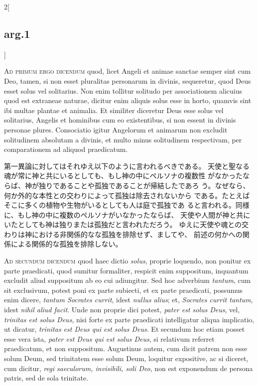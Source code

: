 \documentclass[paper=a4paper,fontsize=10pt,jafontsize=9pt,titlepage]{jlreq}
\begin{document}
\begin{paracol}{2}[\subsection{arg.1}]
\switchcolumn*[\subsection{ad.1}]

{\scshape Ad primum ergo dicendum} quod, licet Angeli et animae sanctae semper
 sint cum Deo, tamen, si non esset pluralitas personarum in divinis,
 sequeretur, quod Deus esset solus vel solitarius. Non enim tollitur
 solitudo per associationem alicuius quod est extraneae naturae,
 dicitur enim aliquis solus esse in horto, quamvis sint ibi multae
 plantae et animalia. Et similiter diceretur Deus esse solus vel
 solitarius, Angelis et hominibus cum eo existentibus, si non essent
 in divinis personae plures. Consociatio igitur Angelorum et animarum
 non excludit solitudinem absolutam a divinis, et multo minus
 solitudinem respectivam, per comparationem ad aliquod praedicatum.

\switchcolumn

第一異論に対してはそれゆえ以下のように言われるべきである。
天使と聖なる魂が常に神と共にいるとしても、もし神の中にペルソナの複数性
 がなかったならば、神が独りであることや孤独であることが帰結したであろ
 う。なぜなら、何か外的な本性との交わりによって孤独は除去されないから
 である。たとえばそこに多くの植物や生物がいるとしても人は庭で孤独であ
 ると言われる。同様に、もし神の中に複数のペルソナがいなかったならば、
 天使や人間が神と共にいたとしても神は独りまたは孤独だと言われただろう。
 ゆえに天使や魂との交わりは神における非関係的なな孤独を排除せず、ましてや、
 前述の何かへの関係による関係的な孤独を排除しない。

\switchcolumn*[\subsection{ad.2}]

{\scshape Ad secundum dicendum} quod haec dictio {\itshape solus}, proprie loquendo, non
 ponitur ex parte praedicati, quod sumitur formaliter, respicit enim
 suppositum, inquantum excludit aliud suppositum ab eo cui
 adiungitur. Sed hoc adverbium {\itshape tantum}, cum sit exclusivum, potest poni
 ex parte subiecti, et ex parte praedicati, possumus enim dicere,
 {\itshape tantum Socrates currit}, idest {\itshape nullus alius}; et, {\itshape Socrates currit
 tantum}, idest {\itshape nihil aliud facit}. Unde non proprie dici potest, {\itshape pater
 est solus Deus}, vel, {\itshape trinitas est solus Deus}, nisi forte ex parte
 praedicati intelligatur aliqua implicatio, ut dicatur, {\itshape trinitas est
 Deus qui est solus Deus}. Et secundum hoc etiam posset esse vera ista,
 {\itshape pater est Deus qui est solus Deus}, si relativum referret praedicatum,
 et non suppositum. Augustinus autem, cum dicit patrem non esse solum
 Deum, sed trinitatem esse solum Deum, loquitur expositive, ac si
 diceret, cum dicitur, {\itshape regi saeculorum, invisibili, soli Deo}, non est
 exponendum de persona patris, sed de sola trinitate.


\end{paracol}
\end{document}
